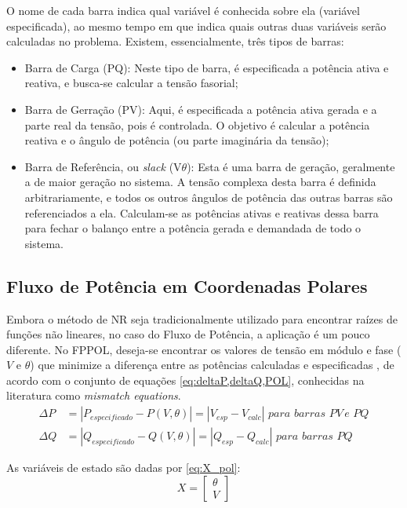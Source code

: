 O nome de cada barra indica qual variável é conhecida sobre ela (variável especificada), ao mesmo tempo em que indica quais outras duas variáveis serão calculadas no problema. Existem, essencialmente, três tipos de barras:
\begin{itemize}
    \item Barra de Carga (PQ): Neste tipo de barra, é especificada a potência ativa e reativa, e busca-se calcular a tensão fasorial;
    \item Barra de Gerração (PV): Aqui, é especificada a potência ativa gerada e a parte real da tensão, pois é controlada. O objetivo é calcular a potência reativa e o ângulo de potência (ou parte imaginária da tensão);
    \item Barra de Referência, ou \textit{slack} (V$\theta$): Esta é uma barra de geração, geralmente a de maior geração no sistema. A tensão complexa desta barra é definida arbitrariamente, e todos os outros ângulos de potência das outras barras são referenciados a ela. Calculam-se as potências ativas e reativas dessa barra para fechar o balanço entre a potência gerada e demandada de todo o sistema.
\end{itemize}

\subsection{Fluxo de Potência em Coordenadas Polares}

Embora o método de \ac{NR} seja tradicionalmente utilizado para encontrar raízes de funções não lineares, no caso do Fluxo de Potência, a aplicação é um pouco diferente. No \ac{FPPOL}, deseja-se encontrar os valores de tensão em módulo e fase ($V$ e $\theta$) que minimize a diferença entre as potências calculadas e especificadas \cite{FluxoDePotenciaIgor}, de acordo com o conjunto de equações \eqref{eq:deltaP,deltaQ,POL}, conhecidas na literatura como \textit{mismatch equations}.
\begin{equation}\label{eq:deltaP,deltaQ,POL}
    \begin{split}
            \Delta P &= |P_{especificado}-P(V, \theta)|=|V_{esp}-V_{calc}|\,\,para\,\,barras\,\,PV\,e \,\,PQ\\
            \Delta Q &= |Q_{especificado}-Q(V, \theta)|=|Q_{esp}-Q_{calc}|\,\, para\,\,barras\,\,PQ    \end{split}
\end{equation}

As variáveis de estado são dadas por \eqref{eq:X_pol}:
\begin{equation}\label{eq:X_pol}
    X =
    \begin{bmatrix}
        \theta\\
        V 
    \end{bmatrix}    
\end{equation}

